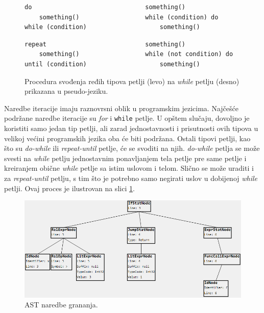 \begin{figure}[h!]
\begin{lstlisting}
do                               something()
    something()                  while (condition) do
while (condition)                    something()
\end{lstlisting}
\begin{lstlisting}
repeat                           something()
    something()                  while (not condition) do
until (condition)                    something()
\end{lstlisting}
\caption{Procedura svođenja ređih tipova petlji (levo) na \emph{while} petlju (desno) prikazana u pseudo-jeziku.}
\label{fig:ASTIterationStatements}
\end{figure}

Naredbe iteracije imaju raznovrsni oblik u programskim jezicima. Najčešće podržane naredbe iteracije su \emph{for} i \texttt{while} petlje. U opštem slučaju, dovoljno je koristiti samo jedan tip petlji, ali zarad jednostavnosti i prisutnosti ovih tipova u velikoj većini programskih jezika oba će biti podržana. Ostali tipovi petlji, kao što su \emph{do-while} ili \emph{repeat-until} petlje, će se svoditi na njih. \emph{do-while} petlja se može svesti na \emph{while} petlju jednostavnim ponavljanjem tela petlje pre same petlje i kreiranjem obične \emph{while} petlje sa istim uslovom i telom. Slično se može uraditi i za \emph{repeat-until} petlju, s tim što je potrebno samo negirati uslov u dobijenoj \emph{while} petlji. Ovaj proces je ilustrovan na slici \ref{fig:ASTIterationStatements}. 

\begin{figure}[h!]
\centering
\includegraphics[scale=0.7]{images/ast_stat.png}
\caption{AST naredbe grananja.}
\label{fig:MyASTExampleStatement}
\end{figure}
